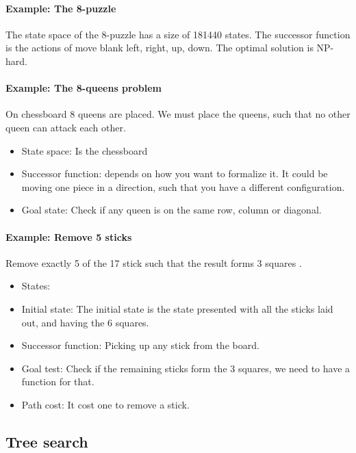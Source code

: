 \documentclass{article}
\begin{document}
\paragraph{Example: The 8-puzzle}
The state space of the 8-puzzle has a size of 181440 states. The successor
function is the actions of move blank left, right, up, down. The optimal
solution is NP-hard\cite[p. 17]{presentation:solving_problems_by_searching}.

\paragraph{Example: The 8-queens problem}
On chessboard 8 queens are placed. We must place the queens, such that no other
queen can attack each other. 
\begin{itemize}
  \item State space: Is the chessboard
  \item Successor function: depends on how you want to formalize it. It could be
    moving one piece in a direction, such that you have a different
    configuration.
  \item Goal state: Check if any queen is on the same row, column or diagonal.
\end{itemize}

\paragraph{Example: Remove 5 sticks}
Remove exactly 5 of the 17 stick such that the result forms 3
squares \cite[p. 18]{presentation:solving_problems_by_searching}.

\begin{itemize}
  \item States: 
  \item Initial state: The initial state is the state presented with all the
    sticks laid out, and having the 6 squares.
  \item Successor function: Picking up any stick from the board.
  \item Goal test: Check if the remaining sticks form the 3 squares, we need to
    have a function for that.
  \item Path cost: It cost one to remove a stick.
\end{itemize}


\subsection{Tree search}
\end{document}
